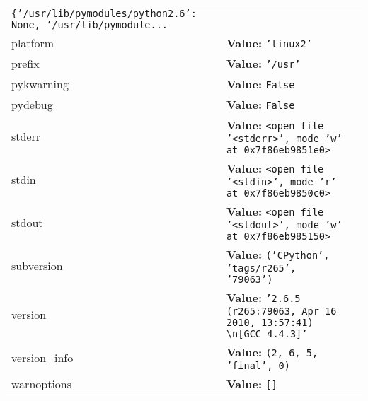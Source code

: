 \begin{longtable}{|p{\varnamewidth}|p{\vardescrwidth}|l}
{\tt \texttt{\{}\texttt{'}\texttt{/usr/lib/pymodules/python2.6}\texttt{'}\texttt{: }None\texttt{, }\texttt{'}\texttt{/usr/lib/pymodule}\texttt{...}}&\\
\cline{1-2}
\raggedright p\-l\-a\-t\-f\-o\-r\-m\- & \raggedright \textbf{Value:} 
{\tt \texttt{'}\texttt{linux2}\texttt{'}}&\\
\cline{1-2}
\raggedright p\-r\-e\-f\-i\-x\- & \raggedright \textbf{Value:} 
{\tt \texttt{'}\texttt{/usr}\texttt{'}}&\\
\cline{1-2}
\raggedright p\-y\-3\-k\-w\-a\-r\-n\-i\-n\-g\- & \raggedright \textbf{Value:} 
{\tt False}&\\
\cline{1-2}
\raggedright p\-y\-d\-e\-b\-u\-g\- & \raggedright \textbf{Value:} 
{\tt False}&\\
\cline{1-2}
\raggedright s\-t\-d\-e\-r\-r\- & \raggedright \textbf{Value:} 
{\tt {\textless}open file '{\textless}stderr{\textgreater}', mode 'w' at 0x7f86eb9851e0{\textgreater}}&\\
\cline{1-2}
\raggedright s\-t\-d\-i\-n\- & \raggedright \textbf{Value:} 
{\tt {\textless}open file '{\textless}stdin{\textgreater}', mode 'r' at 0x7f86eb9850c0{\textgreater}}&\\
\cline{1-2}
\raggedright s\-t\-d\-o\-u\-t\- & \raggedright \textbf{Value:} 
{\tt {\textless}open file '{\textless}stdout{\textgreater}', mode 'w' at 0x7f86eb985150{\textgreater}}&\\
\cline{1-2}
\raggedright s\-u\-b\-v\-e\-r\-s\-i\-o\-n\- & \raggedright \textbf{Value:} 
{\tt \texttt{(}\texttt{'}\texttt{CPython}\texttt{'}\texttt{, }\texttt{'}\texttt{tags/r265}\texttt{'}\texttt{, }\texttt{'}\texttt{79063}\texttt{'}\texttt{)}}&\\
\cline{1-2}
\raggedright v\-e\-r\-s\-i\-o\-n\- & \raggedright \textbf{Value:} 
{\tt \texttt{'}\texttt{2.6.5 (r265:79063, Apr 16 2010, 13:57:41) {\textbackslash}n[GCC 4.4.3]}\texttt{'}}&\\
\cline{1-2}
\raggedright v\-e\-r\-s\-i\-o\-n\-\_\-i\-n\-f\-o\- & \raggedright \textbf{Value:} 
{\tt \texttt{(}2\texttt{, }6\texttt{, }5\texttt{, }\texttt{'}\texttt{final}\texttt{'}\texttt{, }0\texttt{)}}&\\
\cline{1-2}
\raggedright w\-a\-r\-n\-o\-p\-t\-i\-o\-n\-s\- & \raggedright \textbf{Value:} 
{\tt \texttt{[}\texttt{]}}&\\
\cline{1-2}
\end{longtable}

